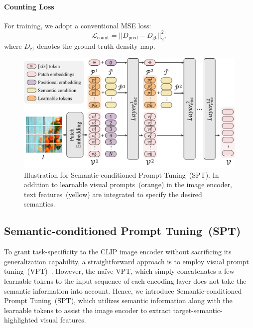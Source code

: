 \paragraph{Counting Loss}
For training, we adopt a conventional MSE loss:
\begin{equation}
\label{eq3countingloss}
    \mathcal{L}_\text{count} = ||D_\text{pred} - D_\text{gt} ||^2_2,
\end{equation}
where $D_\text{gt}$ denotes the ground truth density map.



\begin{figure}[h]
    \begin{center}
    \includegraphics[width=\linewidth]{figs/SPT.pdf}
    \end{center}
    \caption{
        Illustration for Semantic-conditioned Prompt Tuning~(SPT).
        In addition to learnable visual prompts~(orange) in the image encoder, text features~(yellow) are integrated to specify the desired semantics.
    }
    \label{fig:SPT}
\end{figure}



\subsection{Semantic-conditioned Prompt Tuning~(SPT)}
\label{Method:SPT}
To grant task-specificity to the CLIP image encoder without sacrificing its generalization capability, a straightforward approach is to employ visual prompt tuning~(VPT)~\cite{2022vpt}.
However, the na\"ive VPT, which simply concatenates a few learnable tokens to the input sequence of each encoding layer does not take the semantic information into account.
Hence, we introduce Semantic-conditioned Prompt Tuning~(SPT), which utilizes semantic information along with the learnable tokens to assist the image encoder to extract target-semantic-highlighted visual features.


